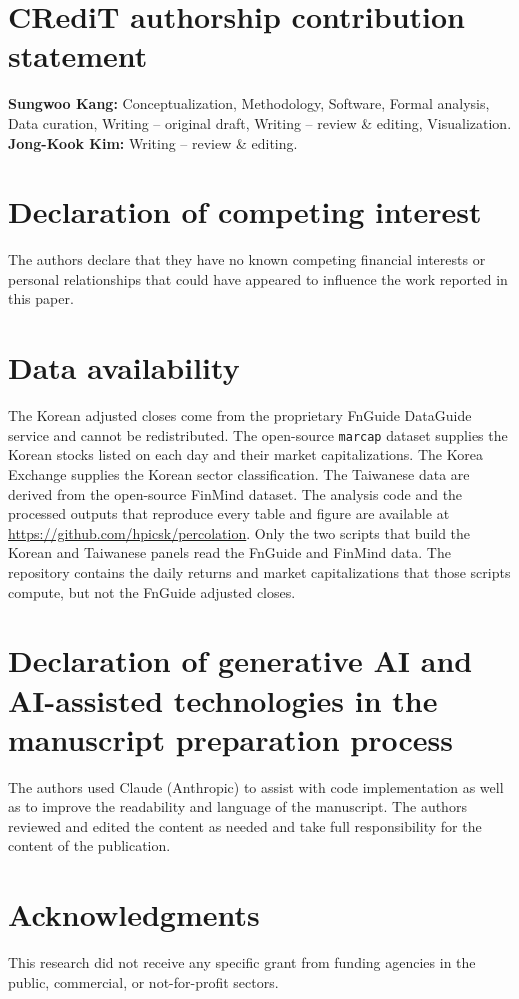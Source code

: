 \documentclass[a4paper,fleqn]{cas-sc}
\begin{document}
\section*{CRediT authorship contribution statement}

\noindent \textbf{Sungwoo Kang:} Conceptualization, Methodology, Software, Formal analysis, Data curation, Writing -- original draft, Writing -- review \& editing, Visualization. \textbf{Jong-Kook Kim:} Writing -- review \& editing.

\section*{Declaration of competing interest}

\noindent The authors declare that they have no known competing financial interests or personal relationships that could have appeared to influence the work reported in this paper.

\section*{Data availability}

\noindent The Korean adjusted closes come from the proprietary FnGuide DataGuide service and cannot be redistributed. The open-source \texttt{marcap} dataset supplies the Korean stocks listed on each day and their market capitalizations. The Korea Exchange supplies the Korean sector classification. The Taiwanese data are derived from the open-source FinMind dataset. The analysis code and the processed outputs that reproduce every table and figure are available at \url{https://github.com/hpicsk/percolation}. Only the two scripts that build the Korean and Taiwanese panels read the FnGuide and FinMind data. The repository contains the daily returns and market capitalizations that those scripts compute, but not the FnGuide adjusted closes.

\section*{Declaration of generative AI and AI-assisted technologies in the manuscript preparation process}

\noindent The authors used Claude (Anthropic) to assist with code implementation as well as to improve the readability and language of the manuscript. The authors reviewed and edited the content as needed and take full responsibility for the content of the publication.

\section*{Acknowledgments}

\noindent This research did not receive any specific grant from funding agencies in the public, commercial, or not-for-profit sectors.



\end{document}
